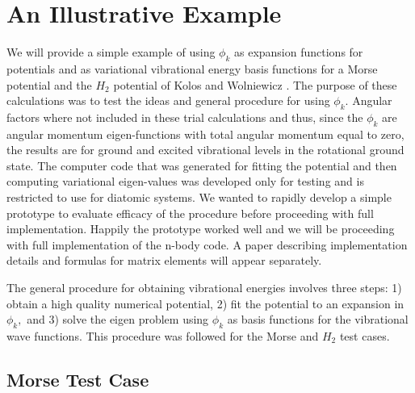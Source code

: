 \section{An Illustrative Example}

We will provide a simple example of using $\phi _k$ as expansion functions
for potentials and as variational vibrational energy basis functions for a
Morse potential and the $H_2$ potential of Kolos and Wolniewicz\cite{Kolos65}%
. The purpose of these calculations was to test the ideas and general
procedure for using $\phi _k$. Angular factors where not included in these
trial calculations and thus, since the $\phi _k$ are angular momentum
eigen-functions with total angular momentum equal to zero, the results are
for ground and excited vibrational levels in the rotational ground state.
The computer code that was generated for fitting the potential and then
computing variational eigen-values was developed only for testing and is
restricted to use for diatomic systems. We wanted to rapidly develop a
simple prototype to evaluate efficacy of the procedure before proceeding
with full implementation. Happily the prototype worked well and we will be
proceeding with full implementation of the n-body code. A paper describing
implementation details and formulas for matrix elements will appear
separately.

The general procedure for obtaining vibrational energies involves three
steps: 1) obtain a high quality numerical potential, 2) fit the potential to
an expansion in $\phi _k,$ and 3) solve the eigen problem using $\phi _k$ as
basis functions for the vibrational wave functions. This procedure was
followed for the Morse and $H_2$ test cases.

\subsection{Morse Test Case}

